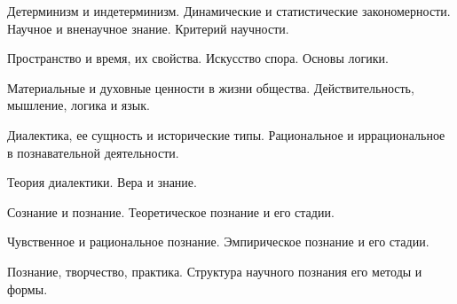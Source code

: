 \documentclass[
	14pt,
	a4paper,
	]
	{scrartcl}
\begin{document}
\vfill
\z 	Детерминизм и индетерминизм. Динамические и статистические закономерности.
 \vfill
\z 	Научное и  вненаучное знание. Критерий научности.
 \vfill

\vfill

\newpage


\shapk
{}
\setcounter{zad}{0}

\vfill
\z 	 Пространство и время, их свойства.
 \vfill
\z 	Искусство спора. Основы логики.
 \vfill

\vfill

\newpage


\shapk
{}
\setcounter{zad}{0}

\vfill
\z 	Материальные и духовные ценности в жизни общества.
 \vfill
\z 	Действительность, мышление, логика и язык.
 \vfill

\vfill

\newpage


\shapk
{}
\setcounter{zad}{0}

\vfill
\z 	Диалектика, ее сущность и исторические типы.
 \vfill
\z 	Рациональное и иррациональное в познавательной деятельности.
 \vfill

\vfill

\newpage


\shapk
{}
\setcounter{zad}{0}

\vfill
\z 	Теория диалектики.
 \vfill
\z 	Вера и знание.
 \vfill

\vfill

\newpage


\shapk
{}
\setcounter{zad}{0}

\vfill
\z 	Сознание и познание.
 \vfill
\z 	Теоретическое познание и его стадии.
 \vfill

\vfill

\newpage


\shapk
{}
\setcounter{zad}{0}

\vfill
\z 	Чувственное и рациональное познание.
 \vfill
\z 	Эмпирическое познание и его стадии.
 \vfill

\vfill

\newpage


\shapk
{}
\setcounter{zad}{0}

\vfill
\z 	Познание, творчество, практика.
 \vfill
\z 	Структура научного познания его методы и формы.
 \vfill

\vfill

\newpage
\end{document}
